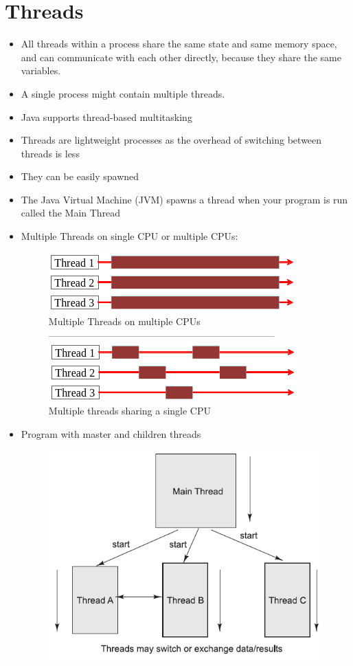 \documentclass[12pt, a4paper]{book}
\begin{document}
\section{Threads}
\begin{itemize}
    \item All threads within a process share the same state and same memory space, and can communicate with each other directly, because they share the same variables.
    \item A single process might contain multiple threads.
    \item Java supports thread-based multitasking
    \item Threads are lightweight processes as the overhead of switching between threads is less
    \item They can be easily spawned
    \item The Java Virtual Machine (JVM) spawns a thread when your program is run called the Main Thread
    \item Multiple Threads on single CPU or multiple CPUs:\begin{figure}[!h]
              \includegraphics[width=0.4\linewidth]{figures/Multiple-threads-on-multiple-CPUs.png}
              Multiple Threads on multiple CPUs
              \\ ----------------------------------------------------------------------- \\
              \includegraphics[width=0.4\linewidth]{figures/Multiple-threads-sharing-a-single-CPU.png}
              Multiple threads sharing a single CPU
          \end{figure}
    \item Program with master and children threads \begin{figure}[!h]
              \centering
              \includegraphics[width=0.6\linewidth]{figures/Program-with-master-and-children-threads.png}
          \end{figure}
\end{itemize}
\end{document}
